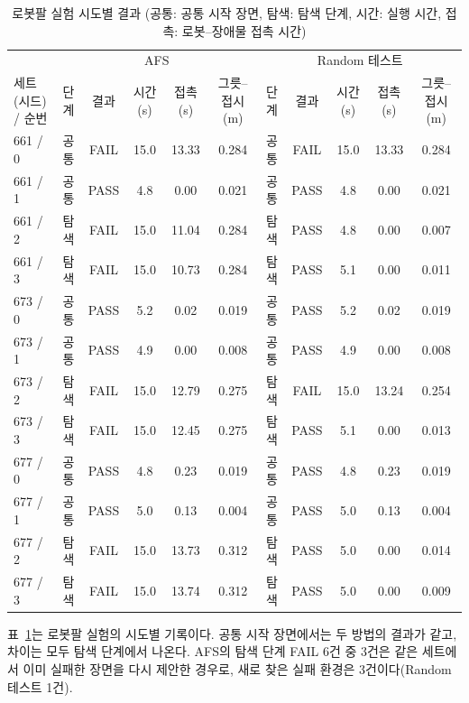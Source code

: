 \begin{table}[!t]
\centering\scriptsize
\caption{로봇팔 실험 시도별 결과 (공통: 공통 시작 장면, 탐색: 탐색 단계, 시간: 실행 시간, 접촉: 로봇–장애물 접촉 시간)}\label{tab:trials}
\begin{tabular}{@{}lccccc|ccccc@{}}
\toprule
& \multicolumn{5}{c|}{AFS} & \multicolumn{5}{c}{Random 테스트} \\
세트(시드) / 순번 & 단계 & 결과 & 시간(s) & 접촉(s) & 그릇–접시(m) & 단계 & 결과 & 시간(s) & 접촉(s) & 그릇–접시(m) \\
\midrule
661 / 0 & 공통 & FAIL & 15.0 & 13.33 & 0.284 & 공통 & FAIL & 15.0 & 13.33 & 0.284 \\
661 / 1 & 공통 & PASS & 4.8 & 0.00 & 0.021 & 공통 & PASS & 4.8 & 0.00 & 0.021 \\
661 / 2 & 탐색 & FAIL & 15.0 & 11.04 & 0.284 & 탐색 & PASS & 4.8 & 0.00 & 0.007 \\
661 / 3 & 탐색 & FAIL & 15.0 & 10.73 & 0.284 & 탐색 & PASS & 5.1 & 0.00 & 0.011 \\
673 / 0 & 공통 & PASS & 5.2 & 0.02 & 0.019 & 공통 & PASS & 5.2 & 0.02 & 0.019 \\
673 / 1 & 공통 & PASS & 4.9 & 0.00 & 0.008 & 공통 & PASS & 4.9 & 0.00 & 0.008 \\
673 / 2 & 탐색 & FAIL & 15.0 & 12.79 & 0.275 & 탐색 & FAIL & 15.0 & 13.24 & 0.254 \\
673 / 3 & 탐색 & FAIL & 15.0 & 12.45 & 0.275 & 탐색 & PASS & 5.1 & 0.00 & 0.013 \\
677 / 0 & 공통 & PASS & 4.8 & 0.23 & 0.019 & 공통 & PASS & 4.8 & 0.23 & 0.019 \\
677 / 1 & 공통 & PASS & 5.0 & 0.13 & 0.004 & 공통 & PASS & 5.0 & 0.13 & 0.004 \\
677 / 2 & 탐색 & FAIL & 15.0 & 13.73 & 0.312 & 탐색 & PASS & 5.0 & 0.00 & 0.014 \\
677 / 3 & 탐색 & FAIL & 15.0 & 13.74 & 0.312 & 탐색 & PASS & 5.0 & 0.00 & 0.009 \\
\bottomrule
\end{tabular}
\end{table}

표~\ref{tab:trials}는 로봇팔 실험의 시도별 기록이다. 
공통 시작 장면에서는 두 방법의 결과가 같고, 차이는 모두 탐색 단계에서 나온다. 
AFS의 탐색 단계 FAIL 6건 중 3건은 같은 세트에서 이미 실패한 장면을 다시 제안한 경우로, 새로 찾은 실패 환경은 3건이다(Random 테스트 1건).

